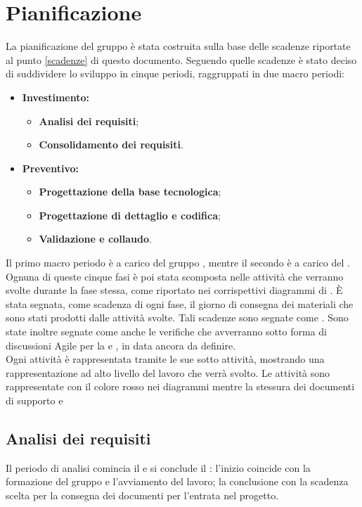 \documentclass[PianoDiProgetto.tex]{subfiles}
\begin{document}
\chapter{Pianificazione}
La pianificazione del gruppo \gruppo è stata costruita sulla base delle scadenze riportate al punto \ref{scadenze} di questo documento. Seguendo quelle scadenze è stato deciso di suddividere lo sviluppo in cinque periodi, raggruppati in due macro periodi:
\begin{itemize}
	\item \textbf{Investimento:}
		\begin{itemize}
			\item \textbf{Analisi dei requisiti};
			\item \textbf{Consolidamento dei requisiti}.
		\end{itemize}
	\item \textbf{Preventivo:}
		\begin{itemize}
			\item \textbf{Progettazione della base tecnologica};
			\item \textbf{Progettazione di dettaglio e codifica};
			\item \textbf{Validazione e collaudo}.
		\end{itemize}
\end{itemize}
Il primo macro periodo è a carico del gruppo \gruppo, mentre il secondo è a carico del .\\
Ognuna di queste cinque fasi è poi stata scomposta nelle attività che verranno svolte durante la fase stessa, come riportato nei corrispettivi diagrammi di . \`{E} stata segnata, come scadenza di ogni fase, il giorno di consegna dei materiali che sono stati prodotti dalle attività svolte. Tali scadenze sono segnate come .
Sono state inoltre segnate come  anche le verifiche che avverranno sotto forma di discussioni Agile per la \tb e \pb, in data ancora da definire.\\ Ogni attività è rappresentata tramite le sue sotto attività, mostrando una rappresentazione ad alto livello del lavoro che verrà svolto.
Le attività sono rappresentate con il colore rosso nei diagrammi  mentre la stessura dei documenti di supporto e 
\newpage

\section{Analisi dei requisiti}
Il periodo di analisi comincia il  e si conclude il : l'inizio coincide con la formazione del gruppo e l'avviamento del lavoro; la conclusione con la scadenza scelta per la consegna dei documenti per l'entrata nel progetto.
\end{document}
